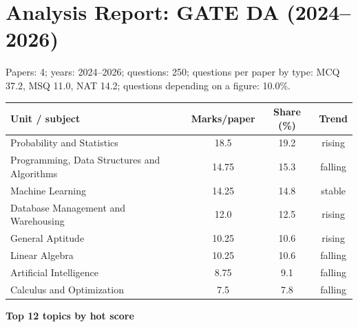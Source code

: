 \section{Analysis Report: GATE DA (2024--2026)}
Papers: 4; years: 2024--2026; questions: 250; questions per paper by type: MCQ 37.2, MSQ 11.0, NAT 14.2; questions depending on a figure: 10.0\%.
\begin{center}\small\begin{tabular}{@{}lccc@{}}\toprule \textbf{Unit / subject} & \textbf{Marks/paper} & \textbf{Share (\%)} & \textbf{Trend}\\\midrule
Probability and Statistics & 18.5 & 19.2 & rising\\
Programming, Data Structures and Algorithms & 14.75 & 15.3 & falling\\
Machine Learning & 14.25 & 14.8 & stable\\
Database Management and Warehousing & 12.0 & 12.5 & rising\\
General Aptitude & 10.25 & 10.6 & rising\\
Linear Algebra & 10.25 & 10.6 & falling\\
Artificial Intelligence & 8.75 & 9.1 & falling\\
Calculus and Optimization & 7.5 & 7.8 & falling\\
\bottomrule\end{tabular}\end{center}
\noindent\textbf{Top 12 topics by hot score}\par\smallskip
